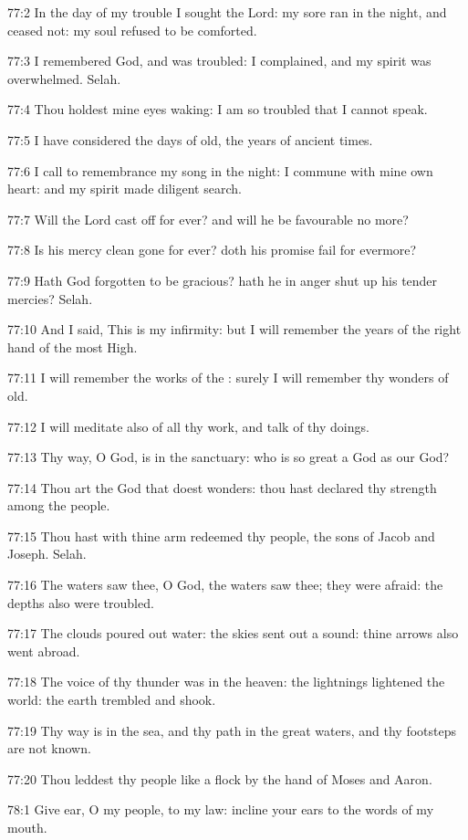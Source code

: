 77:2 In the day of my trouble I sought the Lord: my sore ran in the night, and ceased not: my soul refused to be comforted.

77:3 I remembered God, and was troubled: I complained, and my spirit was overwhelmed. Selah.

77:4 Thou holdest mine eyes waking: I am so troubled that I cannot speak.

77:5 I have considered the days of old, the years of ancient times.

77:6 I call to remembrance my song in the night: I commune with mine own heart: and my spirit made diligent search.

77:7 Will the Lord cast off for ever? and will he be favourable no more?

77:8 Is his mercy clean gone for ever? doth his promise fail for evermore?

77:9 Hath God forgotten to be gracious? hath he in anger shut up his tender mercies? Selah.

77:10 And I said, This is my infirmity: but I will remember the years of the right hand of the most High.

77:11 I will remember the works of the \LORD: surely I will remember thy wonders of old.

77:12 I will meditate also of all thy work, and talk of thy doings.

77:13 Thy way, O God, is in the sanctuary: who is so great a God as our God?

77:14 Thou art the God that doest wonders: thou hast declared thy strength among the people.

77:15 Thou hast with thine arm redeemed thy people, the sons of Jacob and Joseph. Selah.

77:16 The waters saw thee, O God, the waters saw thee; they were afraid: the depths also were troubled.

77:17 The clouds poured out water: the skies sent out a sound: thine arrows also went abroad.

77:18 The voice of thy thunder was in the heaven: the lightnings lightened the world: the earth trembled and shook.

77:19 Thy way is in the sea, and thy path in the great waters, and thy footsteps are not known.

77:20 Thou leddest thy people like a flock by the hand of Moses and Aaron.



78:1 Give ear, O my people, to my law: incline your ears to the words of my mouth.

